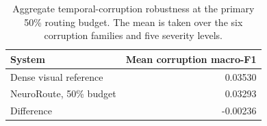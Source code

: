 
\begin{table}[t]
\centering
\caption{Aggregate temporal-corruption robustness at the primary 50\%
routing budget. The mean is taken over the six corruption families and five
severity levels.}
\label{tab:robustness}
\begin{tabular}{lr}
\toprule
System & Mean corruption macro-F1\\
\midrule
Dense visual reference & 0.03530\\
NeuroRoute, 50\% budget & 0.03293\\
Difference & -0.00236\\
\bottomrule
\end{tabular}
\end{table}
